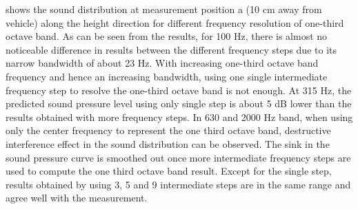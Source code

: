 \noindent{} shows the sound distribution at measurement position a (10 cm away from vehicle) along the height direction for different frequency resolution of one-third octave band. As can be seen from the results, for 100 Hz, there is almost no noticeable difference in results between the different frequency steps due to its narrow bandwidth of about 23 Hz. With increasing one-third octave band frequency and hence an increasing bandwidth, using one single intermediate frequency step to resolve the one-third octave band is not enough. At 315 Hz, the predicted sound pressure level using only single step is about 5 dB lower than the results obtained with more frequency steps. In 630 and 2000 Hz band, when using only the center frequency to represent the one third octave band, destructive interference effect in the sound distribution can be observed. The sink in the sound pressure curve is smoothed out once more intermediate frequency steps are used to compute the one third octave band result. Except for the single step, results obtained by using 3, 5 and 9 intermediate steps are in the same range and agree well with the measurement.

